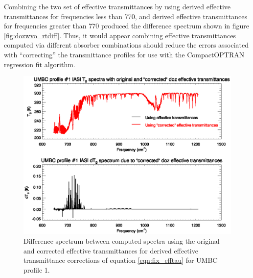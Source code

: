 Combining the two set of effective transmittances by using  derived effective transmittances for frequencies less than 770\invcm{}, and  derived effective transmittances for frequencies greater than 770\invcm{} produced the difference spectrum shown in figure \ref{fig:dozwvo_rtdiff}. Thus, it would appear combining effective transmittances computed via different absorber combinations should reduce the errors associated with ``correcting'' the transmittance profiles for use with the CompactOPTRAN regression fit algorithm. 
\begin{figure}[htp]
  \centering
  \includegraphics[bb=70 219 540 395,clip,scale=0.8]{graphics/doz_rtdiff.eps}
  \caption{Difference spectrum between computed spectra using the original and corrected effective transmittances for  derived effective transmittance corrections of equation \ref{eqn:fix_efftau} for UMBC profile 1.}
  \label{fig:doz_rtdiff}
\end{figure}
